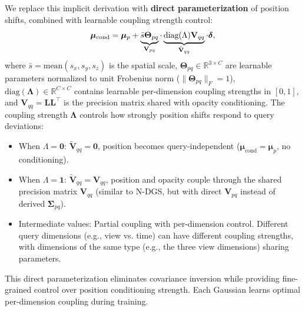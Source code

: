 \documentclass{article}
\theoremstyle{plain}
\theoremstyle{definition}
\theoremstyle{remark}
\begin{document}
We replace this implicit derivation with \textbf{direct parameterization} of position shifts, combined with learnable coupling strength control:
\begin{equation}
\vspace{-0.3em}
\boldsymbol{\mu}_{\text{cond}} = \boldsymbol{\mu}_p + \underbrace{\bar{s} \boldsymbol{\Theta}_{pq}}_{\mathbf{V}_{pq}} \cdot \underbrace{\text{diag}(\Lambda) \mathbf{V}_{qq}}_{\tilde{\mathbf{V}}_{qq}} \cdot \boldsymbol{\delta},
\vspace{-0.3em}
\end{equation}
where $\bar{s} = \text{mean}(s_x, s_y, s_z)$ is the spatial scale, $\boldsymbol{\Theta}_{pq} \in \mathbb{R}^{3 \times C}$ are learnable parameters normalized to unit Frobenius norm ($\|\boldsymbol{\Theta}_{pq}\|_F = 1$), $\text{diag}(\boldsymbol{\Lambda}) \in \mathbb{R}^{C \times C}$ contains learnable per-dimension coupling strengths in $[0,1]$, and $\mathbf{V}_{qq} = \mathbf{L}\mathbf{L}^\top$ is the precision matrix shared with opacity conditioning. The coupling strength $\boldsymbol{\Lambda}$ controls how strongly position shifts respond to query deviations:
\vspace{-0.5em}
\begin{itemize}[leftmargin=*]
\item When $\Lambda = \mathbf{0}$: $\tilde{\mathbf{V}}_{qq} = \mathbf{0}$, position becomes query-independent ($\boldsymbol{\mu}_{\text{cond}} = \boldsymbol{\mu}_p$, no conditioning).
\item When $\Lambda = \mathbf{1}$: $\tilde{\mathbf{V}}_{qq} = \mathbf{V}_{qq}$, position and opacity couple through the shared precision matrix $\mathbf{V}_{qq}$ (similar to N-DGS, but with direct $\mathbf{V}_{pq}$ instead of derived $\boldsymbol{\Sigma}_{pq}$).
\item Intermediate values: Partial coupling with per-dimension control. Different query dimensions (e.g., view vs. time) can have different coupling strengths, with dimensions of the same type (e.g., the three view dimensions) sharing parameters.
\vspace{-0.5em}
\end{itemize}
This direct parameterization eliminates covariance inversion while providing fine-grained control over position conditioning strength. Each Gaussian learns optimal per-dimension coupling during training.
\end{document}
